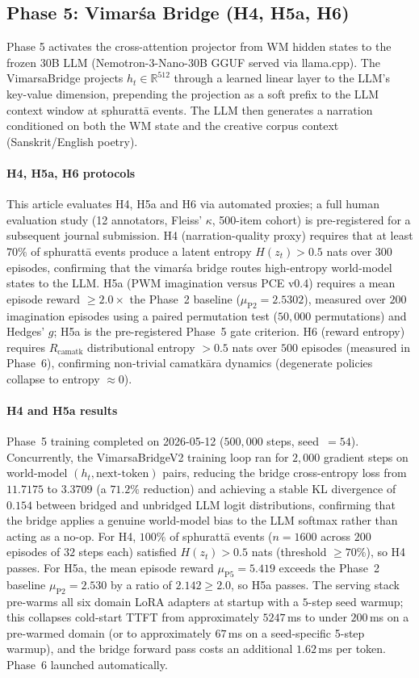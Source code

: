 \documentclass[journal,onecolumn,11pt]{IEEEtran}
\begin{document}
\subsection{Phase 5: Vimarśa Bridge (H4, H5a, H6)}

Phase 5 activates the cross-attention projector from WM hidden states to the
frozen 30B LLM (Nemotron-3-Nano-30B GGUF served via llama.cpp).
The VimarsaBridge projects $h_t \in \mathbb{R}^{512}$ through a learned linear
layer to the LLM's key-value dimension, prepending the projection as a soft prefix
to the LLM context window at sphurattā events.
The LLM then generates a narration conditioned on both the WM state and the
creative corpus context (Sanskrit/English poetry).

\paragraph{H4, H5a, H6 protocols}
This article evaluates H4, H5a and H6 via automated proxies; a full human
evaluation study (12 annotators, Fleiss' $\kappa$, 500-item cohort) is
pre-registered for a subsequent journal submission.
H4 (narration-quality proxy) requires that at least $70\%$ of sphurattā
events produce a latent entropy $H(z_t) > 0.5$ nats over $300$ episodes,
confirming that the vimarśa bridge routes high-entropy world-model states to
the LLM.
H5a (PWM imagination versus PCE v0.4) requires a mean episode reward
$\geq 2.0\times$ the Phase~2 baseline ($\mu_{\text{P2}} = 2.5302$), measured
over $200$ imagination episodes using a paired permutation test
($50{,}000$ permutations) and Hedges' $g$; H5a is the pre-registered Phase~5
gate criterion.
H6 (reward entropy) requires $R_{\text{camatk}}$ distributional entropy
$> 0.5$ nats over $500$ episodes (measured in Phase~6), confirming
non-trivial camatkāra dynamics (degenerate policies collapse to entropy
$\approx 0$).

\paragraph{H4 and H5a results}
Phase~5 training completed on 2026-05-12 ($500{,}000$ steps, seed~$=54$).
Concurrently, the VimarsaBridgeV2 training loop ran for $2{,}000$ gradient
steps on world-model $(h_t, \text{next-token})$ pairs, reducing the bridge
cross-entropy loss from $11.7175$ to $3.3709$ (a $71.2\%$ reduction) and
achieving a stable KL divergence of $0.154$ between bridged and unbridged
LLM logit distributions, confirming that the bridge applies a genuine
world-model bias to the LLM softmax rather than acting as a no-op.
For H4, $100\%$ of sphurattā events ($n=1600$ across $200$ episodes of $32$
steps each) satisfied $H(z_t) > 0.5$ nats (threshold $\geq 70\%$), so H4
passes.
For H5a, the mean episode reward $\mu_{\text{P5}} = 5.419$ exceeds the
Phase~2 baseline $\mu_{\text{P2}} = 2.530$ by a ratio of $2.142 \geq 2.0$,
so H5a passes.
The serving stack pre-warms all six domain LoRA adapters at startup with a
$5$-step seed warmup; this collapses cold-start TTFT from approximately
$5247$\,ms to under $200$\,ms on a pre-warmed domain (or to approximately
$67$\,ms on a seed-specific 5-step warmup), and the bridge forward pass
costs an additional $1.62$\,ms per token.
Phase~6 launched automatically.
\end{document}
